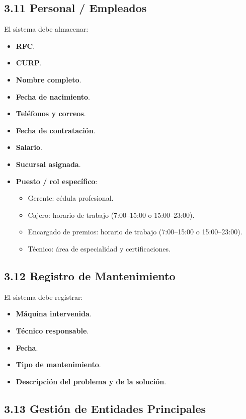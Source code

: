 \documentclass[12pt,a4paper]{article}
\begin{document}
\subsection*{3.11 Personal / Empleados}

El sistema debe almacenar:

\begin{itemize}
    \item \textbf{RFC}.
    \item \textbf{CURP}.
    \item \textbf{Nombre completo}.
    \item \textbf{Fecha de nacimiento}.
    \item \textbf{Teléfonos y correos}.
    \item \textbf{Fecha de contratación}.
    \item \textbf{Salario}.
    \item \textbf{Sucursal asignada}.
    \item \textbf{Puesto / rol específico}:
    \begin{itemize}
        \item Gerente: cédula profesional.
        \item Cajero: horario de trabajo (7:00--15:00 o 15:00--23:00).
        \item Encargado de premios: horario de trabajo (7:00--15:00 o 15:00--23:00).
        \item Técnico: área de especialidad y certificaciones.
    \end{itemize}
\end{itemize}

\subsection*{3.12 Registro de Mantenimiento}

El sistema debe registrar:

\begin{itemize}
    \item \textbf{Máquina intervenida}.
    \item \textbf{Técnico responsable}.
    \item \textbf{Fecha}.
    \item \textbf{Tipo de mantenimiento}.
    \item \textbf{Descripción del problema y de la solución}.
\end{itemize}

\subsection*{3.13 Gestión de Entidades Principales}
\end{document}
